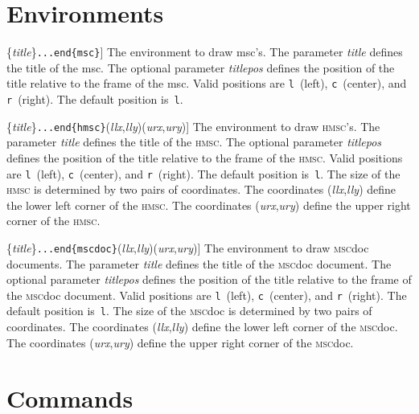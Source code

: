 \documentclass[a4paper]{article}
\newcommand{\cmd}[1]{\texttt{\bslash #1}}
\newcommand{\acro}[1]{{\scshape\lowercase{#1}}}
\newcommand\MSC{\acro{MSC}}
\newcommand\HMSC{\acro{HMSC}}
\newcommand{\MSCdoc}{\MSC{}doc}
\newcommand{\opt}[1]{[#1]}
\newcommand{\coordarg}[1]{\emph{#1}}
\newcommand{\coordargs}[2]{(\coordarg{#1},\coordarg{#2})}
\newenvironment{defs}{%
  \begin{list}{}%
              {\setlength{\labelwidth}{0pt}%
               \setlength{\labelsep}{1em}%
               \setlength{\leftmargin}{1em}%
               \setlength{\parsep}{1ex}%
               \setlength{\listparindent}{0pt}%
               \setlength{\rightmargin}{0pt}%
               \renewcommand{\makelabel}[1]{##1}%
               \raggedright%
              }%
  }{%
  \end{list}}
\begin{document}
\section{Environments}

\begin{defs}

\item[\cmd{begin}\texttt{\{msc\}}\opt{titlepos}\{\emph{title}\}\texttt{...\cmd{end}\{msc\}}]
The environment to draw msc's. The parameter \emph{title} defines the
title of the msc. The optional parameter \emph{titlepos} defines the
position of the title relative to the frame of the msc. Valid
positions are \verb|l|~(left), \verb|c|~(center), and
\verb|r|~(right). The default position is~\verb|l|.

\item[\cmd{begin}\texttt{\{hmsc\}}\opt{titlepos}\{\emph{title}\}\texttt{...\cmd{end}\{hmsc\}}\coordargs{llx}{lly}\coordargs{urx}{ury}]
The environment to draw \HMSC's. The parameter \emph{title} defines the
title of the \HMSC. The optional parameter \emph{titlepos} defines the
position of the title relative to the frame of the \HMSC. Valid
positions are \verb|l|~(left), \verb|c|~(center), and
\verb|r|~(right). The default position is~\verb|l|. The size of the
\HMSC{} is determined by two pairs of coordinates. The coordinates
\coordargs{llx}{lly} define the lower left corner of the \HMSC. The
coordinates \coordargs{urx}{ury} define the upper right corner of the
\HMSC.

\item[\cmd{begin}\texttt{\{mscdoc\}}\opt{titlepos}\{\emph{title}\}\texttt{...\cmd{end}\{mscdoc\}}\coordargs{llx}{lly}\coordargs{urx}{ury}]
The environment to draw \MSCdoc{} documents. The parameter
\emph{title} defines the title of the \MSCdoc{} document. The optional
parameter \emph{titlepos} defines the position of the title relative
to the frame of the \MSCdoc{} document. Valid positions are \verb|l|~(left),
\verb|c|~(center), and \verb|r|~(right). The default position
is~\verb|l|. The size of the \MSCdoc{} is determined by two pairs of
coordinates. The coordinates \coordargs{llx}{lly} define the lower
left corner of the \MSCdoc. The coordinates \coordargs{urx}{ury}
define the upper right corner of the \MSCdoc.


\end{defs}


\section{Commands}
\end{document}
